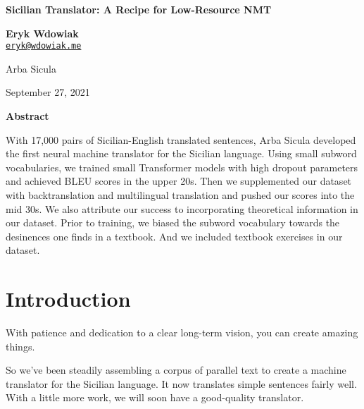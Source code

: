 \documentclass[10pt,letterpaper]{article}
\newenvironment{absmarg}{
\begingroup
    \fontsize{10pt}{11pt}\selectfont
}{
  \par
  \endgroup
}
\begin{document}
\thispagestyle{empty}





\vspace*{0em}
\begin{center}
  {\Large{\textbf{Sicilian Translator: A Recipe for Low-Resource NMT}}}

  {\large{\textbf{Eryk Wdowiak}}}\\ \href{mailto:eryk@wdowiak.me}{\texttt{eryk@wdowiak.me}}
  
{\large{Arba Sicula}}

September 27, 2021
\end{center}



\begin{center}
  \textbf{Abstract}
\end{center}

\vspace{-1.5em}
\begin{adjustwidth}{0.5in}{0.5in}
\begin{absmarg} 
  With 17,000 pairs of Sicilian-English translated sentences,
  Arba Sicula developed the first neural machine translator for the Sicilian language.
  Using small subword vocabularies, we trained small Transformer models
  with high dropout parameters and achieved BLEU scores in the upper 20s.
  Then we supplemented our dataset with backtranslation and multilingual
  translation and pushed our scores into the mid 30s.
  We also attribute our success to incorporating theoretical information in our dataset.
  Prior to training, we biased the subword vocabulary towards the desinences one finds in a textbook.
  And we included textbook exercises in our dataset.
\end{absmarg}
\end{adjustwidth}





\section{Introduction}

With patience and dedication to a clear long-term vision, you can create amazing things.

So we've been steadily assembling a corpus of parallel text to create a machine translator for the Sicilian language. 
It now translates simple sentences fairly well. With a little more work, we will soon have a good-quality translator.
\end{document}
